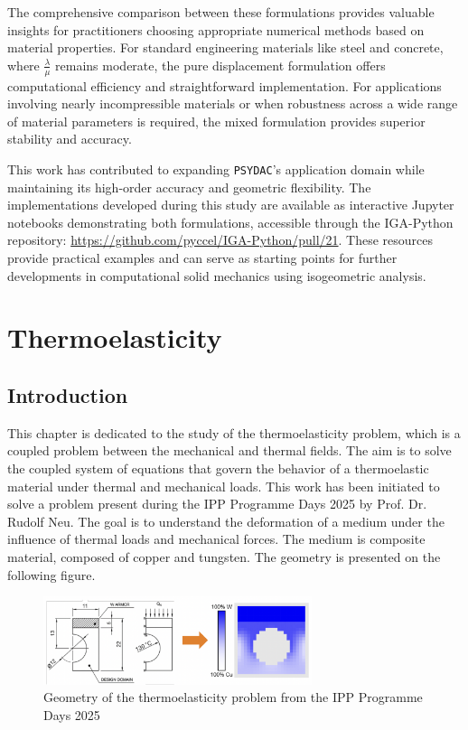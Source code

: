 \documentclass[a4paper,12pt,twoside]{report}
\begin{document}
The comprehensive comparison between these formulations provides valuable insights for practitioners choosing appropriate numerical methods based on material properties. For standard engineering materials like steel and concrete, where $\frac{\lambda}{\mu}$ remains moderate, the pure displacement formulation offers computational efficiency and straightforward implementation. For applications involving nearly incompressible materials or when robustness across a wide range of material parameters is required, the mixed formulation provides superior stability and accuracy.

This work has contributed to expanding \texttt{PSYDAC}'s application domain while maintaining its high-order accuracy and geometric flexibility. The implementations developed during this study are available as interactive Jupyter notebooks demonstrating both formulations, accessible through the IGA-Python repository: \href{https://github.com/pyccel/IGA-Python/pull/21}{https://github.com/pyccel/IGA-Python/pull/21}. These resources provide practical examples and can serve as starting points for further developments in computational solid mechanics using isogeometric analysis.


\chapter{Thermoelasticity}
\section{Introduction}
This chapter is dedicated to the study of the thermoelasticity problem, which is a coupled problem between the mechanical and thermal fields. The aim is to solve the coupled system of equations that govern the behavior of a thermoelastic material under thermal and mechanical loads. This work has been initiated to solve a problem present during the IPP Programme Days 2025 by Prof. Dr. Rudolf Neu. The goal is to understand the deformation of a medium under the influence of thermal loads and mechanical forces. The medium is composite material, composed of copper and tungsten. The geometry is presented on the following figure.
\begin{figure}[!h]
	\centering
	\includegraphics[width=0.7\textwidth]{figures/geometry_thermoelasticity.png}
	\caption{Geometry of the thermoelasticity problem from the IPP Programme Days 2025}
	\label{fig:geometry_thermoelasticity}
\end{figure}
\end{document}
